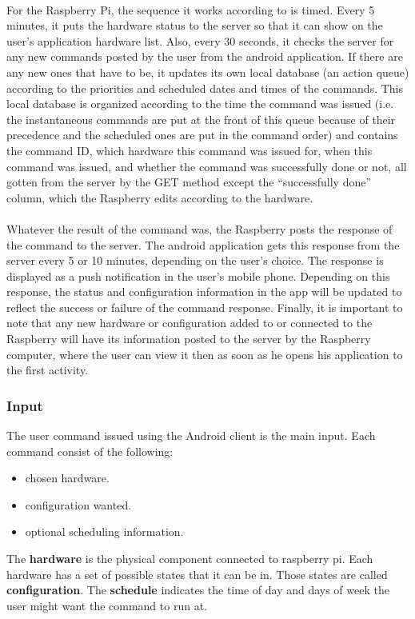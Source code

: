 \documentclass[12pt, oneside, a4paper]{book}
\begin{document}
				\paragraph{}For the Raspberry Pi, the sequence it works according to is timed. Every 5 minutes, it puts the hardware status to the server so that it can show on the user’s application hardware list. Also, every 30 seconds, it checks the server for any new commands posted by the user from the android application. If there are any new ones that have to be, it updates its own local database (an action queue) according to the priorities and scheduled dates and times of the commands. This local database is organized according to the time the command was issued (i.e. the instantaneous commands are put at the front of this queue because of their precedence and the scheduled ones are put in the command order) and contains the command ID, which hardware this command was issued for, when this command was issued, and whether the command was successfully done or not, all gotten from the server by the GET method except the “successfully done” column, which the Raspberry edits according to the hardware. 
				\paragraph{}Whatever the result of the command was, the Raspberry posts the response of the command to the server. The android application gets this response from the server every 5 or 10 minutes, depending on the user’s choice. The response is displayed as a push notification in the user’s mobile phone. Depending on this response, the status and configuration information in the app will be updated to reflect the success or failure of the command response. Finally, it is important to note that any new hardware or configuration added to or connected to the Raspberry will have its information posted to the server by the Raspberry computer, where the user can view it then as soon as he opens his application to the first activity.
				
				\subsubsection{Input}
				The user command issued using the Android client is the main input. Each command consist of the following:
				\begin{itemize}
					\item chosen hardware.
					\item configuration wanted.
					\item optional scheduling information.
				\end{itemize}
				The \textbf{hardware} is the physical component connected to raspberry pi. Each hardware has a set of possible states that it can be in. Those states are called \textbf{configuration}. The \textbf{schedule} indicates the time of day and days of week the user might want the command to run at.
\end{document}
